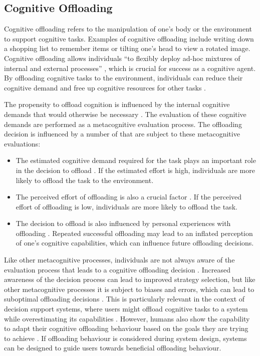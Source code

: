 \subsection{Cognitive Offloading} \label{ssec:cognitive_offloading}

Cognitive offloading refers to the manipulation of one's body or the environment to support cognitive tasks. Examples of cognitive offloading include writing down a shopping list to remember items or tilting one's head to view a rotated image. Cognitive offloading allows individuals “to flexibly deploy ad-hoc mixtures of internal and external processes” \parencite{Risko2016}, which is crucial for success as a cognitive agent. By offloading cognitive tasks to the environment, individuals can reduce their cognitive demand and free up cognitive resources for other tasks \parencite{Risko2016}.

The propensity to offload cognition is influenced by the internal cognitive demands that would otherwise be necessary \parencite{Gilbert2015, Risko2015}. The evaluation of these cognitive demands are performed as a metacognitive evaluation process. The offloading decision is influenced by a number of that are subject to these metacognitive evaluations:

\begin{itemize}
    \item The estimated cognitive demand required for the task plays an important role in the decision to offload \parencite{Risko2015}. If the estimated effort is high, individuals are more likely to offload the task to the environment.
    \item The perceived effort of offloading is also a crucial factor \parencite{Risko2015}. If the perceived effort of offloading is low, individuals are more likely to offload the task.
    \item The decision to offload is also influenced by personal experiences with offloading \parencite{Ward2013}. Repeated successful offloading may lead to an inflated perception of one's cognitive capabilities, which can influence future offloading decisions.
\end{itemize}

Like other metacognitive processes, individuals are not always aware of the evaluation process that leads to a cognitive offloading decision \parencite{Schunn2001}. Increased awareness of the decision process can lead to improved strategy selection, but like other metacognitive processes it is subject to biases and errors, which can lead to suboptimal offloading decisions \parencite{Risko2015}. This is particularly relevant in the context of decision support systems, where users might offload cognitive tasks to a system while overestimating its capabilities \parencite{Jussupow2021}. However, humans also show the capability to adapt their cognitive offloading behaviour based on the goals they are trying to achieve \parencite{Weis2019}. If offloading behaviour is considered during system design, systems can be designed to guide users towards beneficial offloading behaviour.

